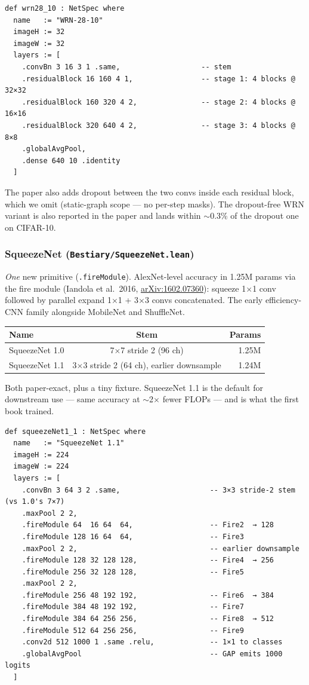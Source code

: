 \begin{verbatim}
def wrn28_10 : NetSpec where
  name   := "WRN-28-10"
  imageH := 32
  imageW := 32
  layers := [
    .convBn 3 16 3 1 .same,                   -- stem
    .residualBlock 16 160 4 1,                -- stage 1: 4 blocks @ 32×32
    .residualBlock 160 320 4 2,               -- stage 2: 4 blocks @ 16×16
    .residualBlock 320 640 4 2,               -- stage 3: 4 blocks @ 8×8
    .globalAvgPool,
    .dense 640 10 .identity
  ]
\end{verbatim}

The paper also adds dropout between the two convs inside each
residual block, which we omit (static-graph scope --- no per-step
masks). The dropout-free WRN variant is also reported in the
paper and lands within $\sim$0.3\% of the dropout one on CIFAR-10.

\subsubsection*{SqueezeNet (\texttt{Bestiary/SqueezeNet.lean})}
\emph{One} new primitive (\texttt{.fireModule}). AlexNet-level accuracy in 1.25M params
via the fire module (Iandola et al.\ 2016,
\href{https://arxiv.org/abs/1602.07360}{arXiv:1602.07360}): squeeze 1$\times$1 conv followed by parallel
expand 1$\times$1 + 3$\times$3 convs concatenated. The early
efficiency-CNN family alongside MobileNet and ShuffleNet.

\begin{center}
\begin{tabular}{l c r}
\hline
Name           & Stem               & Params \\
\hline
SqueezeNet 1.0 & 7$\times$7 stride 2 (96 ch) & 1.25M \\
SqueezeNet 1.1 & 3$\times$3 stride 2 (64 ch), earlier downsample & 1.24M \\
\hline
\end{tabular}
\end{center}

Both paper-exact, plus a tiny fixture. SqueezeNet 1.1 is the
default for downstream use --- same accuracy at $\sim$2$\times$
fewer FLOPs --- and is what the first book trained.

\begin{verbatim}
def squeezeNet1_1 : NetSpec where
  name   := "SqueezeNet 1.1"
  imageH := 224
  imageW := 224
  layers := [
    .convBn 3 64 3 2 .same,                     -- 3×3 stride-2 stem (vs 1.0's 7×7)
    .maxPool 2 2,
    .fireModule 64  16 64  64,                  -- Fire2  → 128
    .fireModule 128 16 64  64,                  -- Fire3
    .maxPool 2 2,                               -- earlier downsample
    .fireModule 128 32 128 128,                 -- Fire4  → 256
    .fireModule 256 32 128 128,                 -- Fire5
    .maxPool 2 2,
    .fireModule 256 48 192 192,                 -- Fire6  → 384
    .fireModule 384 48 192 192,                 -- Fire7
    .fireModule 384 64 256 256,                 -- Fire8  → 512
    .fireModule 512 64 256 256,                 -- Fire9
    .conv2d 512 1000 1 .same .relu,             -- 1×1 to classes
    .globalAvgPool                              -- GAP emits 1000 logits
  ]
\end{verbatim}

